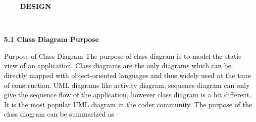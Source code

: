 \documentclass[12pt]{report}
\renewcommand{\_}{\kern-1.5pt\textunderscore\kern-1.5pt}
\begin{document}
\vspace{\baselineskip}

\vspace{\baselineskip}

\vspace{\baselineskip}

\vspace{\baselineskip}

\vspace{\baselineskip}

\vspace{\baselineskip}

\vspace{\baselineskip}

\vspace{\baselineskip}

\vspace{\baselineskip}
\begin{adjustwidth}{5.0in}{0.84in}
\begin{justify}
{\fontsize{24pt}{28.8pt}\selectfont \textbf{\textcolor[HTML]{0D0D0D}{\ \ \ \  DESIGN}}\par}
\end{justify}\par

\end{adjustwidth}

\tab 
\vspace{\baselineskip}
\vspace{\baselineskip}
\vspace{\baselineskip}
\begin{adjustwidth}{0.3in}{0.84in}
{\fontsize{14pt}{16.8pt}\selectfont \textbf{\textcolor[HTML]{0D0D0D}{\ \ \  }}\par}\par

\end{adjustwidth}

\begin{adjustwidth}{0.3in}{0.84in}
{\fontsize{14pt}{16.8pt}\selectfont \textbf{\textcolor[HTML]{0D0D0D}{5.1 Class Diagram Purpose}}\par}\par

\end{adjustwidth}

\tab 
\vspace{\baselineskip}\begin{adjustwidth}{0.3in}{0.84in}
\textcolor[HTML]{0D0D0D}{Purpose of Class Diagram The purpose of class diagram is to model the static view of an application. Class diagrams are the only diagrams which can be directly mapped with object-oriented languages and thus widely used at the time of construction. UML diagrams like activity diagram, sequence diagram can only give the sequence flow of the application, however class diagram is a bit different. It is the most popular UML diagram in the coder community. The purpose of the class diagram can be summarized as – }\par

\end{adjustwidth}
\end{document}
